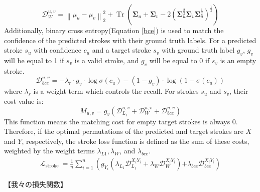 \begin{equation}
    \label{Wasserstein}
    \mathcal{D}_W^{u, v}=\left\|\mu_u-\mu_v\right\|_2^2+\operatorname{Tr}\left(\boldsymbol{\Sigma}_u+\boldsymbol{\Sigma}_v-2\left(\boldsymbol{\Sigma}_u^{\frac{2}{2}} \boldsymbol{\Sigma}_v \boldsymbol{\Sigma}_u^{\frac{1}{2}}\right)^{\frac{1}{2}}\right)
\end{equation}
Additionally, binary cross entropy(Equation \ref{bce}) is used to match the confidence of the
predicted strokes with their ground truth labels. 
For a predicted stroke $s_u$ with confidence $c_u$ and a target stroke $s_v$ 
with ground truth label $g_v$,  $g_v$ will be equal to 1 if $s_v$ is a valid 
stroke, and $g_v$ will be equal to 0 if $s_v$ is an empty stroke.
\begin{equation}
    \label{bce}
    \mathcal{D}_{b c e}^{u, v}=-\lambda_r \cdot g_v \cdot \log \sigma\left(c_u\right)-\left(1-g_v\right) \cdot \log \left(1-\sigma\left(c_u\right)\right)
\end{equation}
where $\lambda_r$ is a weight term which controls the recall.
For strokes $s_u$ and $s_v$, their cost value is:
\begin{equation}
    M_{u, v}=g_v\left(\mathcal{D}_{L_1}^{u, v}+\mathcal{D}_W^{u, v}+\mathcal{D}_{b c e}^{u, v}\right)
\end{equation}
This function means the matching cost for empty target strokes is always 0.
Therefore, if the optimal permutations of the predicted and target strokes are $X$ and $Y$, 
respectively, the stroke loss function is defined as the sum of these costs, 
weighted by the weight terms  $\lambda_{L1}, \lambda_W$, and $\lambda_{bce}$.
\begin{equation}
    \begin{gathered}
        \mathcal{L}_{\text {stroke }}=\frac{1}{n} \sum_{i=1}^n\left(g_{Y_i}\left(\lambda_{L_1} \mathcal{D}_{L_1}^{X_i Y_i}+\lambda_W \mathcal{D}_W^{X_i Y_i}\right)\right.
        \left.+\lambda_{b c e} \mathcal{D}_{b c e}^{X_i Y_i}\right)
        \end{gathered}
\end{equation}

【我々の損失関数】
